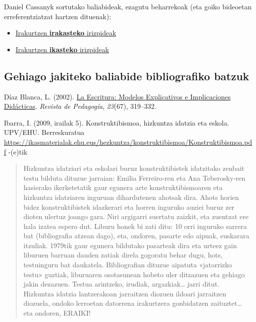 \documentclass[
]{book}
\providecommand{\tightlist}{%
  \setlength{\itemsep}{0pt}\setlength{\parskip}{0pt}}
\begin{document}
Daniel Cassanyk sortutako baliabideak, ezagutu beharrekoak (eta goiko bideoetan erreferentziatzat hartzen dituenak):

\begin{itemize}
\tightlist
\item
  \href{http://educalab.es/documents/235507/242734/ep_eso_prof_10clavesparaensenarainterpretar.pdf}{Irakurtzen \textbf{irakasteko} irizpideak}
\item
  \href{http://leer.es/documents/235507/353837/art_alum_ep_eso_leereradigital_10clavesparaaprenderrainterpretar_danielcassany.pdf}{Irakurtzen \textbf{ikasteko} irizpideak}
\end{itemize}

\hypertarget{gehiago-jakiteko-baliabide-bibliografiko-batzuk}{%
\subsection{Gehiago jakiteko baliabide bibliografiko batzuk}\label{gehiago-jakiteko-baliabide-bibliografiko-batzuk}}

Díaz Blanca, L. (2002). \href{http://www.scielo.org.ve/scielo.php?script=sci_arttext\&pid=S0798-97922002000200007\&lng=es\&nrm=iso}{La Escritura: Modelos Explicativos e Implicaciones Didácticas}. \emph{Revista de Pedagogía}, \emph{23}(67), 319--332.

Ibarra, I. (2009, irailak 5). Konstruktibismoa, hizkuntza idatzia eta eskola. UPV/EHU. Berreskuratua \url{https://ikasmaterialak.ehu.eus/hezkuntza/konstruktibismoa/Konstruktibismoa.pdf} -(e)tik

\begin{quote}
Hizkuntza idatziari eta eskolari buruz konstruktibistek idatzitako zenbait testu bilduta dituzue jarraian: Emilia Ferreiro‐ren eta Ana Teberosky‐ren hasierako ikerketetatik gaur egunera arte konstruktibismoaren eta hizkuntza idatziaren inguruan dihardutenen ahotsak dira. Ahots horien bidez konstruktibistek idazkerari eta horren inguruko auziei buruz zer dioten ulertuz joango gara. Niri argigarri suertatu zaizkit, eta zuentzat ere hala izatea espero dut. Liburu honek bi zati ditu: 10 orri inguruko sarrera bat (bibliografia atzean dago), eta, ondoren, pasarte edo aipuak, euskarara itzuliak. 1979tik gaur egunera bildutako pasarteak dira eta urteez gain liburuen barruan dauden zatiak direla gogoratu behar dugu, hots, testuinguru bat daukatela. Bibliografian dituzue aipatuta «jatorrizko testu» guztiak, liburuaren osotasunean hobeto uler ditzazuen eta gehiago jakin dezazuen. Testua arintzeko, irudiak, argazkiak\ldots{} jarri ditut.\\
Hizkuntza idatzia lantzerakoan jarraitzen diozuen ildoari jarraitzen diozuela, ondoko lerroetan datorrena irakurtzera gonbidatzen zaituztet\ldots{} eta ondoren, ERAIKI!
\end{quote}
\end{document}
